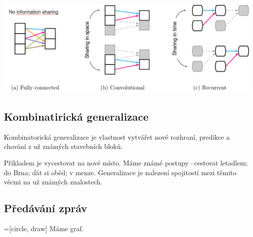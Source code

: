 \begin{center}
	\includegraphics[width=\textwidth]{images/RIB.png}
\end{center}

\subsection{Kombinatirická generalizace}

Kombinatorická generalizace je vlastnost vytvářet nové rozhraní, predikce a chování z už známých stavebních bloků.

Příkladem je vycestovat na nové místo.
Máme známé postupy\,--\,cestovat letadlem; do Brna; dát si oběd; v menze.
Generalizace je nalezení spojitostí mezi těmito věcmi na už známých znalostech.

\subsection{Předávání zpráv}
=[circle, draw]
Máme graf.
\begin{center}
\end{center}

